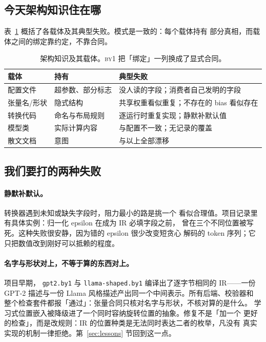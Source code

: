 \documentclass[11pt,a4paper]{ctexart}
\newcommand{\code}[1]{\texttt{#1}}
\newcommand{\byone}{\textsc{by1}}
\begin{document}
\subsection{今天架构知识住在哪}

表~\ref{tab:carriers} 概括了各载体及其典型失败。模式是一致的：每个载体持有
部分真相，而载体之间的绑定靠约定，不靠合同。

\begin{table}[t]
\centering
\caption{架构知识及其载体。\byone{} 把「绑定」一列换成了显式合同。}
\label{tab:carriers}
\begin{tabular}{@{}p{2.8cm}p{4.6cm}p{5.6cm}@{}}
\toprule
载体 & 持有 & 典型失败 \\
\midrule
配置文件 & 超参数、部分标志 & 没人读的字段；消费者自己发明的字段 \\
张量名/形状 & 隐式结构 & 共享权重看似重复；不存在的 bias 看似存在 \\
转换代码 & 命名与布局规则 & 逐运行时重复实现；静默补默认值 \\
模型类 & 实际计算内容 & 与配置不一致；无记录的覆盖 \\
散文文档 & 意图 & 与以上全部漂移 \\
\bottomrule
\end{tabular}
\end{table}

\subsection{我们要打的两种失败}

\paragraph{静默补默认。}转换器遇到未知或缺失字段时，阻力最小的路是挑一个
看似合理值。项目记录里有具体实例：归一化 epsilon 在成为 IR 必填字段之前，
曾在三个不同位置被写死。这种失败很安静，因为错的 epsilon 很少改变短贪心
解码的 token 序列；它只把数值改到刚好可以抵赖的程度。

\paragraph{名字与形状对上，不等于算的东西对上。}项目早期，
\code{gpt2.by1} 与 \code{llama-shaped.by1} 编译出了逐字节相同的 IR——一份
GPT-2 描述与一份 Llama 风格描述产出同一个中间表示。所有后端、校验器和
整个检查套件都报「通过」：张量合同只核对名字与形状，不核对算的是什么。
学习式位置嵌入被降级进了一个同时容纳旋转位置的抽象。修复不是「加一个
更好的检查」，而是改规则：IR 的位置种类是无法同时表达二者的枚举，凡没有
真实实现的机制一律拒绝。第~\ref{sec:lessons} 节回到这一点。
\end{document}
